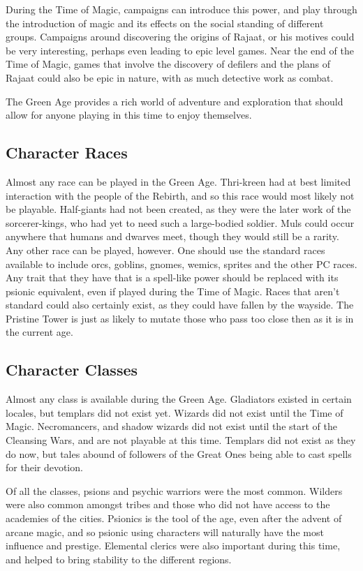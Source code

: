 During the Time of Magic, campaigns can introduce this power, and play through the introduction of magic and its effects on the social standing of different groups. Campaigns around discovering the origins of Rajaat, or his motives could be very interesting, perhaps even leading to epic level games. Near the end of the Time of Magic, games that involve the discovery of defilers and the plans of Rajaat could also be epic in nature, with as much detective work as combat.

The Green Age provides a rich world of adventure and exploration that should allow for anyone playing in this time to enjoy themselves.

\subsection{Character Races}
Almost any race can be played in the Green Age. Thri-kreen had at best limited interaction with the people of the Rebirth, and so this race would most likely not be playable. Half-giants had not been created, as they were the later work of the sorcerer-kings, who had yet to need such a large-bodied soldier. Muls could occur anywhere that humans and dwarves meet, though they would still be a rarity. Any other race can be played, however. One should use the standard races available to include orcs, goblins, gnomes, wemics, sprites and the other PC races. Any trait that they have that is a spell-like power should be replaced with its psionic equivalent, even if played during the Time of Magic. Races that aren't standard could also certainly exist, as they could have fallen by the wayside. The Pristine Tower is just as likely to mutate those who pass too close then as it is in the current age.

\subsection{Character Classes}
Almost any class is available during the Green Age. Gladiators existed in certain locales, but templars did not exist yet. Wizards did not exist until the Time of Magic. Necromancers, and shadow wizards did not exist until the start of the Cleansing Wars, and are not playable at this time. Templars did not exist as they do now, but tales abound of followers of the Great Ones being able to cast spells for their devotion.

Of all the classes, psions and psychic warriors were the most common. Wilders were also common amongst tribes and those who did not have access to the academies of the cities. Psionics is the tool of the age, even after the advent of arcane magic, and so psionic using characters will naturally have the most influence and prestige. Elemental clerics were also important during this time, and helped to bring stability to the different regions.

